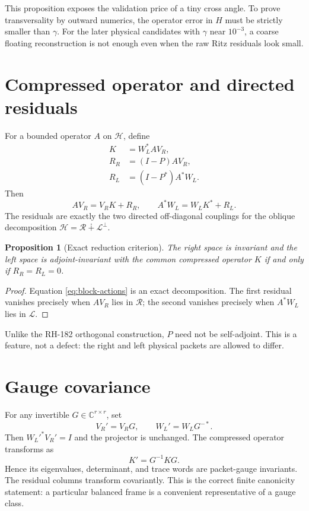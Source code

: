 \documentclass[12pt]{article}
\newtheorem{proposition}[theorem]{Proposition}
\theoremstyle{remark}
\newcommand{\cH}{\mathcal H}
\newcommand{\cR}{\mathcal R}
\newcommand{\cL}{\mathcal L}
\begin{document}
This proposition exposes the validation price of a tiny cross angle.  To
prove transversality by outward numerics, the operator error in $H$ must be
strictly smaller than $\gamma$.  For the later physical candidates with
$\gamma$ near $10^{-3}$, a coarse floating reconstruction is not enough even
when the raw Ritz residuals look small.

\section{Compressed operator and directed residuals}

For a bounded operator $A$ on $\cH$, define
\begin{align}
 K&=W_L^*AV_R,
 \label{eq:compressed}\\
 R_R&=(I-P)AV_R,
 \label{eq:right-residual}\\
 R_L&=(I-P^*)A^*W_L.
 \label{eq:left-residual}
\end{align}
Then
\begin{equation}\label{eq:block-actions}
 AV_R=V_RK+R_R,
 \qquad
 A^*W_L=W_LK^*+R_L.
\end{equation}
The residuals are exactly the two directed off-diagonal couplings for the
oblique decomposition $\cH=\cR\dotplus\cL^\perp$.

\begin{proposition}[Exact reduction criterion]\label{prop:criterion}
The right space is invariant and the left space is adjoint-invariant with
the common compressed operator $K$ if and only if
$R_R=R_L=0$.
\end{proposition}

\begin{proof}
Equation \eqref{eq:block-actions} is an exact decomposition.  The first
residual vanishes precisely when $AV_R$ lies in $\cR$; the second vanishes
precisely when $A^*W_L$ lies in $\cL$.
\end{proof}

Unlike the RH-182 orthogonal construction, $P$ need not be self-adjoint.
This is a feature, not a defect: the right and left physical packets are
allowed to differ.

\section{Gauge covariance}

For any invertible $G\in\mathbb C^{r\times r}$, set
\begin{equation}\label{eq:gauge}
 V_R'=V_RG,
 \qquad
 W_L'=W_LG^{-*}.
\end{equation}
Then $W_L'^*V_R'=I$ and the projector is unchanged.  The compressed operator
transforms as
\begin{equation}\label{eq:gauge-K}
 K'=G^{-1}KG.
\end{equation}
Hence its eigenvalues, determinant, and trace words are packet-gauge
invariants.  The residual columns transform covariantly.  This is the
correct finite canonicity statement: a particular balanced frame is a
convenient representative of a gauge class.
\end{document}
